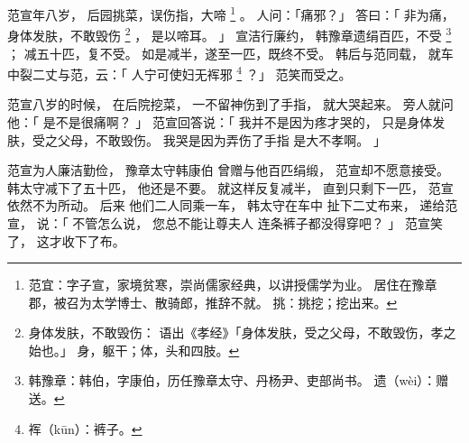 
\switchcolumn*[\section{}]

范宣年八岁，
后园挑菜，误伤指，大啼%
\footnote{%
    范宜：字子宣，家境贫寒，崇尚儒家经典，以讲授儒学为业。
          居住在豫章郡，被召为太学博士、散骑郎，推辞不就。
    挑：挑挖；挖出来。
}%
。
人问：「痛邪？」
答曰：「
    非为痛，
    身体发肤，不敢毁伤%
    \footnote{%
        身体发肤，不敢毁伤：
            语出《孝经》「身体发肤，受之父母，不敢毁伤，孝之始也。」
            身，躯干；体，头和四肢。
    }%
    ，
    是以啼耳。
」
宣洁行廉约，
韩豫章遗绢百匹，不受%
\footnote{%
    韩豫章：韩伯，字康伯，历任豫章太守、丹杨尹、吏部尚书。
    遗（wèi）：赠送。
}%
；
减五十匹，复不受。
如是减半，遂至一匹，既终不受。
韩后与范同载，
就车中裂二丈与范，云：「
    人宁可使妇无裈邪%
    \footnote{%
        裈（kūn）：裤子。
    }%
？」
范笑而受之。

\switchcolumn

范宣八岁的时候，
在后院挖菜，
一不留神伤到了手指，
就大哭起来。
旁人就问他：「
    是不是很痛啊？
」
范宣回答说：「
    我并不是因为疼才哭的，
    只是身体发肤，受之父母，不敢毁伤。
    我哭是因为弄伤了手指
    是大不孝啊。
」

范宣为人廉洁勤俭，
豫章太守韩康伯
曾赠与他百匹绢缎，
范宣却不愿意接受。
韩太守减下了五十匹，
他还是不要。
就这样反复减半，
直到只剩下一匹，
范宣依然不为所动。
后来
他们二人同乘一车，
韩太守在车中
扯下二丈布来，
递给范宣，
说：「
    不管怎么说，
    您总不能让尊夫人
    连条裤子都没得穿吧？
」
范宣笑了，
这才收下了布。

